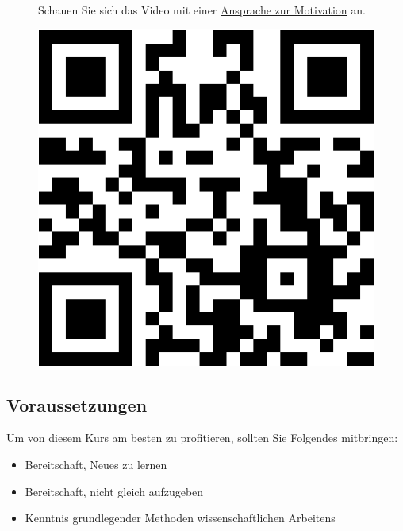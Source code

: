 \documentclass[
  letterpaper,
]{scrbook}
\providecommand{\tightlist}{%
  \setlength{\itemsep}{0pt}\setlength{\parskip}{0pt}}\usepackage{longtable,booktabs,array}
\theoremstyle{definition}
\theoremstyle{definition}
\theoremstyle{definition}
\theoremstyle{remark}
\begin{document}
\begin{figure}

\begin{minipage}{0.80\linewidth}
Schauen Sie sich das Video mit einer
\href{https://youtu.be/jtNlzpcPr5Y}{Ansprache zur Motivation}
an.\end{minipage}%
%
\begin{minipage}{0.20\linewidth}

\begin{center}
\includegraphics[width=0.75\linewidth,height=\textheight,keepaspectratio]{005-orga_files/figure-pdf/unnamed-chunk-2-1.pdf}
\end{center}

\end{minipage}%

\end{figure}%

\subsection{Voraussetzungen}\label{voraussetzungen}

Um von diesem Kurs am besten zu profitieren, sollten Sie Folgendes
mitbringen:

\begin{itemize}
\tightlist
\item
  Bereitschaft, Neues zu lernen
\item
  Bereitschaft, nicht gleich aufzugeben
\item
  Kenntnis grundlegender Methoden wissenschaftlichen Arbeitens
\end{itemize}
\end{document}
